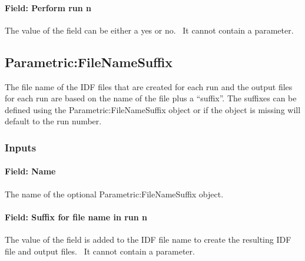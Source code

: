 \paragraph{Field: Perform run n}\label{field-perform-run-n}

The value of the field can be either a yes or no.~ It cannot contain a parameter.

\subsection{Parametric:FileNameSuffix}\label{parametricfilenamesuffix}

The file name of the IDF files that are created for each run and the output files for each run are based on the name of the file plus a ``suffix''. The suffixes can be defined using the Parametric:FileNameSuffix object or if the object is missing will default to the run number.

\subsubsection{Inputs}\label{inputs-3-023}

\paragraph{Field: Name}\label{field-name-2-024}

The name of the optional Parametric:FileNameSuffix object.

\paragraph{Field: Suffix for file name in run n}\label{field-suffix-for-file-name-in-run-n}

The value of the field is added to the IDF file name to create the resulting IDF file and output files.~ It cannot contain a parameter.

